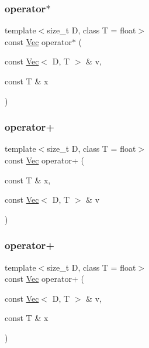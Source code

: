 \subsubsection{\texorpdfstring{operator$\ast$}{operator*}\hspace{0.1cm}{\footnotesize\ttfamily [2/2]}}
{\footnotesize\ttfamily template$<$size\+\_\+t D, class T = float$>$ \\
const \hyperlink{classtrimesh_1_1Vec}{Vec} operator$\ast$ (\begin{DoxyParamCaption}\item[{const \hyperlink{classtrimesh_1_1Vec}{Vec}$<$ D, T $>$ \&}]{v,  }\item[{const T \&}]{x }\end{DoxyParamCaption})\hspace{0.3cm}{\ttfamily [friend]}}

\mbox{\label{classtrimesh_1_1Vec_a06b28f1d6643355f8a25c910a3f303c4}} 
\subsubsection{\texorpdfstring{operator+}{operator+}\hspace{0.1cm}{\footnotesize\ttfamily [1/2]}}
{\footnotesize\ttfamily template$<$size\+\_\+t D, class T = float$>$ \\
const \hyperlink{classtrimesh_1_1Vec}{Vec} operator+ (\begin{DoxyParamCaption}\item[{const T \&}]{x,  }\item[{const \hyperlink{classtrimesh_1_1Vec}{Vec}$<$ D, T $>$ \&}]{v }\end{DoxyParamCaption})\hspace{0.3cm}{\ttfamily [friend]}}

\mbox{\label{classtrimesh_1_1Vec_affd0d0de91f65f28142428beae224277}} 
\subsubsection{\texorpdfstring{operator+}{operator+}\hspace{0.1cm}{\footnotesize\ttfamily [2/2]}}
{\footnotesize\ttfamily template$<$size\+\_\+t D, class T = float$>$ \\
const \hyperlink{classtrimesh_1_1Vec}{Vec} operator+ (\begin{DoxyParamCaption}\item[{const \hyperlink{classtrimesh_1_1Vec}{Vec}$<$ D, T $>$ \&}]{v,  }\item[{const T \&}]{x }\end{DoxyParamCaption})\hspace{0.3cm}{\ttfamily [friend]}}

